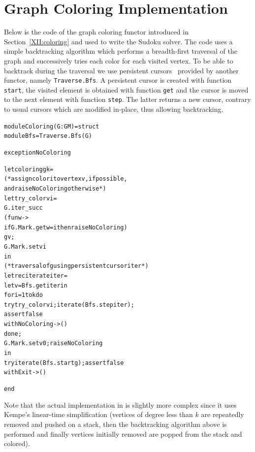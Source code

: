 \section{Graph Coloring Implementation}\label{XII:appendix:coloring}

Below is the code of the graph coloring functor introduced in
Section~\ref{XII:coloring} and used to write the Sudoku solver.
The code uses a simple backtracking algorithm which
performs a breadth-first traversal of the graph and successively tries
each color for each visited vertex. To be able to backtrack during the
traversal we use persistent cursors~\cite{XII:filliatre06} provided by
another \ocamlgraph functor, namely \texttt{Traverse.Bfs}. A
persistent cursor is created with function \texttt{start}, the
visited element is obtained with function \texttt{get} and the cursor
is moved to the next element with function \texttt{step}. The latter
returns a new cursor, contrary to usual cursors which are modified
in-place, thus allowing backtracking.
\begin{alltt}
module Coloring(G : GM) = struct
  module Bfs = Traverse.Bfs(G)

  exception NoColoring

  let coloring g k =
    (* assign color i to vertex v, if possible, 
       and raise NoColoring otherwise *)
    let try_color v i =
      G.iter_succ 
        (fun w -> 
          if G.Mark.get w = i then raise NoColoring) 
        g v;
      G.Mark.set v i
    in
    (* traversal of g using persistent cursor iter *)
    let rec iterate iter =
      let v = Bfs.get iter in
      for i = 1 to k do
        try try_color v i; iterate (Bfs.step iter); 
            assert false
        with NoColoring -> ()
      done;
      G.Mark.set v 0; raise NoColoring
    in
    try iterate (Bfs.start g); assert false 
    with Exit -> ()

end
\end{alltt}
Note that the actual implementation in \ocamlgraph is slightly more complex
since it uses Kempe's linear-time simplification (vertices of degree
less than $k$ are repeatedly removed and pushed on a stack, then the
backtracking algorithm above is performed and finally vertices
initially removed are popped from the stack and colored).

